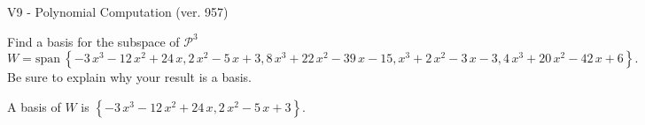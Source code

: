 \begin{exercise}
  \begin{exerciseTitle}V9 - Polynomial Computation (ver. 957)\end{exerciseTitle}
  \begin{exerciseStatement}
    Find a basis for the subspace of \(\mathcal{P}^3\) 
\[W=\mathrm{span}\ \left\{-3 \, x^{3} - 12 \, x^{2} + 24 \, x , 2 \, x^{2} - 5 \, x + 3 , 8 \, x^{3} + 22 \, x^{2} - 39 \, x - 15 , x^{3} + 2 \, x^{2} - 3 \, x - 3 , 4 \, x^{3} + 20 \, x^{2} - 42 \, x + 6\right\}.\]
 Be sure to explain why your result is a basis.


  \end{exerciseStatement}
  \begin{exerciseAnswer}
   A basis of \(W\) is  \(\left\{-3 \, x^{3} - 12 \, x^{2} + 24 \, x , 2 \, x^{2} - 5 \, x + 3\right\}\).
  


  \end{exerciseAnswer}
\end{exercise}